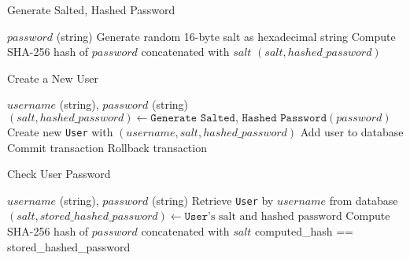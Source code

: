 \begin{algorithm}
\caption{Generate Salted, Hashed Password}
\begin{algorithmic}
\REQUIRE $password$ (string)
\STATE Generate random 16-byte salt as hexadecimal string
\STATE Compute SHA-256 hash of $password$ concatenated with $salt$
\RETURN $(salt, hashed\_password)$
\end{algorithmic}
\end{algorithm}

\begin{algorithm}
\caption{Create a New User}
\begin{algorithmic}
\REQUIRE $username$ (string), $password$ (string)
\STATE $(salt, hashed\_password) \gets \texttt{Generate Salted, Hashed Password}(password)$
\STATE Create new \texttt{User} with $(username, salt, hashed\_password)$
\TRY
    \STATE Add user to database
    \STATE Commit transaction
\EXCEPT
    \STATE Rollback transaction
\ENDTRY
\end{algorithmic}
\end{algorithm}

\begin{algorithm}
\caption{Check User Password}
\begin{algorithmic}
\REQUIRE $username$ (string), $password$ (string)
\STATE Retrieve \texttt{User} by $username$ from database
    \THROW
\ENDIF
\STATE $(salt, stored\_hashed\_password) \gets \texttt{User}\mbox{'s salt and hashed password}$
\STATE Compute SHA-256 hash of $password$ concatenated with $salt$
\RETURN computed\_hash == stored\_hashed\_password
\end{algorithmic}
\end{algorithm}
